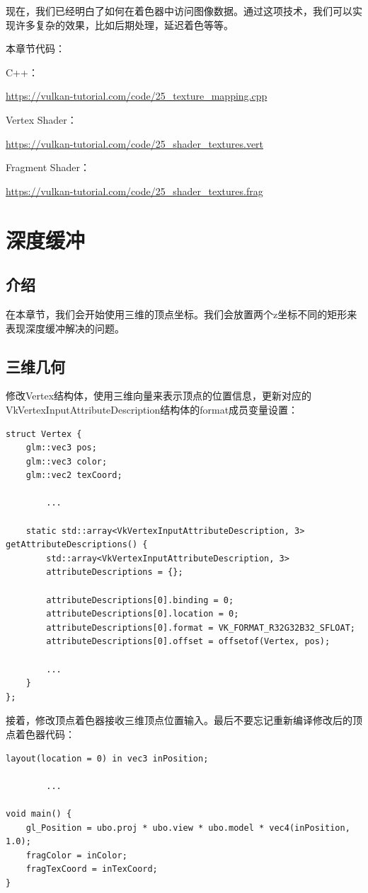 \documentclass{ctexart}
\begin{document}
现在，我们已经明白了如何在着色器中访问图像数据。通过这项技术，我们可以实现许多复杂的效果，比如后期处理，延迟着色等等。

本章节代码：

C++：

\url{https://vulkan-tutorial.com/code/25_texture_mapping.cpp}

Vertex Shader：

\url{https://vulkan-tutorial.com/code/25_shader_textures.vert}

Fragment Shader：

\url{https://vulkan-tutorial.com/code/25_shader_textures.frag}

\newpage
\section{深度缓冲}

\subsection{介绍}

在本章节，我们会开始使用三维的顶点坐标。我们会放置两个z坐标不同的矩形来表现深度缓冲解决的问题。

\subsection{三维几何}

修改Vertex结构体，使用三维向量来表示顶点的位置信息，更新对应的VkVertexInputAttributeDescription结构体的format成员变量设置：

\begin{lstlisting}[language={[ANSI]C}]
struct Vertex {
	glm::vec3 pos;
	glm::vec3 color;
	glm::vec2 texCoord;

		...

	static std::array<VkVertexInputAttributeDescription, 3> getAttributeDescriptions() {
		std::array<VkVertexInputAttributeDescription, 3>
		attributeDescriptions = {};

		attributeDescriptions[0].binding = 0;
		attributeDescriptions[0].location = 0;
		attributeDescriptions[0].format = VK_FORMAT_R32G32B32_SFLOAT;
		attributeDescriptions[0].offset = offsetof(Vertex, pos);

		...
	}
};
\end{lstlisting}

接着，修改顶点着色器接收三维顶点位置输入。最后不要忘记重新编译修改后的顶点着色器代码：

\begin{lstlisting}[language={[ANSI]C}]
layout(location = 0) in vec3 inPosition;

		...

void main() {
	gl_Position = ubo.proj * ubo.view * ubo.model * vec4(inPosition, 1.0);
	fragColor = inColor;
	fragTexCoord = inTexCoord;
}
\end{lstlisting}
\end{document}
